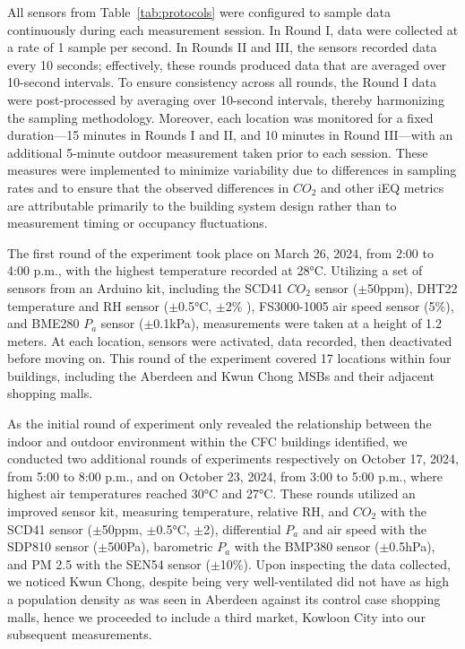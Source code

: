 \documentclass[preprint,12pt]{elsarticle}
\begin{document}
    All sensors from Table~\ref{tab:protocols} were configured to sample data continuously during each measurement session. In Round I, data were collected at a rate of 1 sample per second. In Rounds II and III, the sensors recorded data every 10 seconds; effectively, these rounds produced data that are averaged over 10-second intervals. To ensure consistency across all rounds, the Round I data were post-processed by averaging over 10-second intervals, thereby harmonizing the sampling methodology. Moreover, each location was monitored for a fixed duration—15 minutes in Rounds I and II, and 10 minutes in Round III—with an additional 5-minute outdoor measurement taken prior to each session. These measures were implemented to minimize variability due to differences in sampling rates and to ensure that the observed differences in $CO_2$ and other iEQ metrics are attributable primarily to the building system design rather than to measurement timing or occupancy fluctuations.
    
    The first round of the experiment took place on March 26, 2024, from 2:00 to 4:00 p.m., with the highest temperature recorded at 28°C. Utilizing a set of sensors from an Arduino kit\cite{30}, including the SCD41 $CO_2$ sensor ($\pm$50ppm), DHT22 temperature and RH sensor ($\pm$0.5°C, $\pm$2\% ), FS3000-1005 air speed sensor (5\%), and BME280 $P_a$ sensor ($\pm$0.1kPa), measurements were taken at a height of 1.2 meters\cite{31}. At each location, sensors were activated, data recorded, then deactivated before moving on. This round of the experiment covered 17 locations within four buildings, including the Aberdeen and Kwun Chong MSBs and their adjacent shopping malls.
    
    As the initial round of experiment only revealed the relationship between the indoor and outdoor environment within the CFC buildings identified, we conducted two additional rounds of experiments respectively on October 17, 2024, from 5:00 to 8:00 p.m., and on October 23, 2024, from 3:00 to 5:00 p.m., where highest air temperatures reached 30°C and 27°C. These rounds utilized an improved sensor kit, measuring temperature, relative RH, and $CO_2$ with the SCD41 sensor ($\pm$50ppm, $\pm$0.5°C, $\pm$2), differential $P_a$ and air speed with the SDP810 sensor ($\pm$500Pa), barometric $P_a$ with the BMP380 sensor ($\pm$0.5hPa), and PM 2.5 with the SEN54 sensor ($\pm$10\%). Upon inspecting the data collected, we noticed Kwun Chong, despite being very well-ventilated did not have as high a population density as was seen in Aberdeen against its control case shopping malls, hence we proceeded to include a third market, Kowloon City into our subsequent measurements.
    
\end{document}
